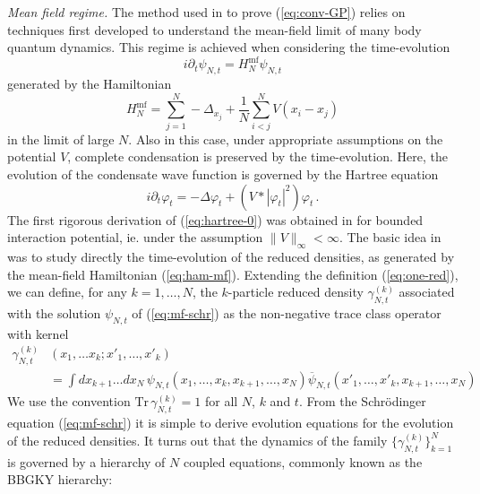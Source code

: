 \documentclass[11pt,a4paper,DIV11]{scrartcl}	%
\newcommand{\tr}{\mbox{Tr}}
\begin{document}
\bigskip

{\it Mean field regime.} The method used in \cite{ESY1,ESY2,ESY3,ESY4} 
to prove (\ref{eq:conv-GP}) relies on techniques first developed to understand the mean-field limit of many body quantum dynamics. This regime is achieved when considering the time-evolution 
\begin{equation}\label{eq:mf-schr}
i\partial_t \psi_{N,t} = H_N^{\text{mf}} \psi_{N,t} 
\end{equation}
generated by the Hamiltonian
\begin{equation}\label{eq:ham-mf} H_N^{\text{mf}} = \sum_{j=1}^N -\Delta_{x_j} + \frac{1}{N} \sum_{i<j}^N V (x_i -x_j) \end{equation}
in the limit of large $N$. Also in this case, under appropriate assumptions on the potential $V$, 
complete condensation is preserved by the time-evolution. Here, the evolution of the condensate wave function is governed by the Hartree equation
\begin{equation}\label{eq:hartree-0} i\partial_t \varphi_t = -\Delta \varphi_t + \left( V * |\varphi_t|^2\right) \varphi_t \,. \end{equation}
The first rigorous derivation of (\ref{eq:hartree-0}) was obtained in \cite{S} for bounded interaction potential, ie. under the assumption $\| V \|_\infty < \infty$. The basic idea in \cite{S} was to study directly the time-evolution of the reduced densities, as generated by the mean-field Hamiltonian (\ref{eq:ham-mf}). Extending the definition (\ref{eq:one-red}), we can define, for any $k=1,\dots , N$, the $k$-particle reduced density $\gamma^{(k)}_{N,t}$ associated with the solution $\psi_{N,t}$ of (\ref{eq:mf-schr}) as the non-negative trace class operator with kernel 
\begin{equation}\label{eq:kred}
\begin{split}
\gamma^{(k)}_{N,t} &(x_1, \dots x_k ; x'_1, \dots ,x'_k) \\ &= \int dx_{k+1} \dots dx_N \, \psi_{N,t} (x_1,\dots , x_k , x_{k+1}, \dots , x_N) \overline{\psi}_{N,t} (x'_1, \dots , x'_k , x_{k+1} , \dots , x_N) \end{split} \end{equation}
We use the convention $\tr \, \gamma^{(k)}_{N,t} = 1$ for all $N$, $k$ and $t$. {F}rom the Schr\"odinger equation (\ref{eq:mf-schr}) it is simple to derive evolution equations for the evolution of the reduced densities. It turns out that the dynamics of the family $\{ \gamma^{(k)}_{N,t} \}_{k=1}^N$ is governed by a hierarchy of $N$ coupled equations, commonly known as the BBGKY hierarchy:
\end{document}
